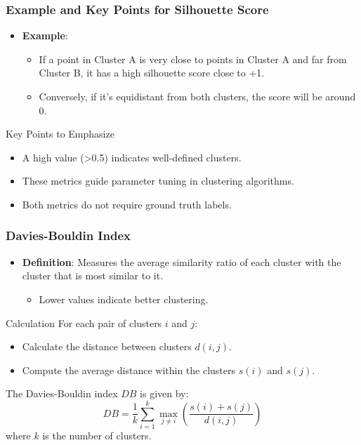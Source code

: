 \documentclass[aspectratio=169]{beamer}
\begin{document}
\begin{frame}[fragile]
    \frametitle{Example and Key Points for Silhouette Score}
    \begin{itemize}
        \item \textbf{Example}: 
            \begin{itemize}
                \item If a point in Cluster A is very close to points in Cluster A and far from Cluster B, it has a high silhouette score close to +1.
                \item Conversely, if it’s equidistant from both clusters, the score will be around 0.
            \end{itemize}
    \end{itemize}
    
    \begin{block}{Key Points to Emphasize}
        \begin{itemize}
            \item A high value (>0.5) indicates well-defined clusters.
            \item These metrics guide parameter tuning in clustering algorithms.
            \item Both metrics do not require ground truth labels.
        \end{itemize}
    \end{block}
\end{frame}

\begin{frame}[fragile]
    \frametitle{Davies-Bouldin Index}
    \begin{itemize}
        \item \textbf{Definition}: Measures the average similarity ratio of each cluster with the cluster that is most similar to it.
        \begin{itemize}
            \item Lower values indicate better clustering.
        \end{itemize}
    \end{itemize}
    
    \begin{block}{Calculation}
        For each pair of clusters \( i \) and \( j \):
        \begin{itemize}
            \item Calculate the distance between clusters \( d(i, j) \).
            \item Compute the average distance within the clusters \( s(i) \) and \( s(j) \).
        \end{itemize}

        The Davies-Bouldin index \( DB \) is given by:
        \begin{equation}
            DB = \frac{1}{k} \sum_{i=1}^{k} \max_{j \neq i} \left( \frac{s(i) + s(j)}{d(i,j)} \right)
        \end{equation}
        where \( k \) is the number of clusters.
    \end{block}
\end{frame}
\end{document}
